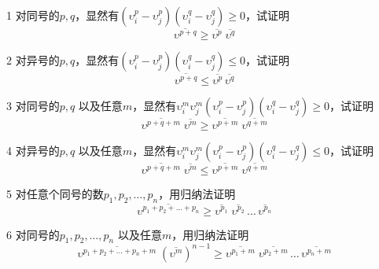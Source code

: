 \documentclass[CJK]{beamer}
\begin{document}
\begin{frame}
\bch
{\scriptsize
\bitem
\item[1]{对同号的$p, q$，显然有$(\upsilon_i^p - \upsilon_j^p)(\upsilon_i^q - \upsilon_j^q) \ge 0$，试证明
$$\overline{\upsilon^{p+q}} \ge \overline{\upsilon^p}\; \overline{\upsilon^q} $$}
\item[2]{
对异号的$p, q$，显然有$(\upsilon_i^p - \upsilon_j^p)(\upsilon_i^q - \upsilon_j^q) \le 0$，试证明
$$\overline{\upsilon^{p+q}} \le \overline{\upsilon^p}\,\overline{\upsilon^q} $$}
\item[3]{对同号的$p, q$ 以及任意$m$，显然有$\upsilon_i^m\upsilon_j^m(\upsilon_i^p - \upsilon_j^p)(\upsilon_i^q - \upsilon_j^q) \ge 0$，试证明
$$\overline{\upsilon^{p+q+m}} \;\overline{\upsilon^{m}} \ge \overline{\upsilon^{p+m}}\; \overline{\upsilon^{q+m}} $$}
\item[4]{对异号的$p, q$ 以及任意$m$，显然有$\upsilon_i^m\upsilon_j^m(\upsilon_i^p - \upsilon_j^p)(\upsilon_i^q - \upsilon_j^q) \le 0$，试证明
$$\overline{\upsilon^{p+q+m}} \;\overline{\upsilon^{m}} \le \overline{\upsilon^{p+m}}\; \overline{\upsilon^{q+m}} $$}
\item[5]{对任意个同号的数$p_1, p_2, \ldots, p_n$，用归纳法证明
$$\overline{\upsilon^{p_1+p_2+\ldots+p_n}} \ge \overline{\upsilon^{p_1}}\; \overline{\upsilon^{p_2}}\, \ldots\,\overline{\upsilon^{p_n}} $$
}
\item[6]{对同号的$p_1,p_2,\ldots, p_n$ 以及任意$m$，用归纳法证明
$$\overline{\upsilon^{p_1+p_2+\ldots+p_n+m}}\; \left(\overline{\upsilon^m}\right)^{n-1}  \ge \overline{\upsilon^{p_1+m}}\; \overline{\upsilon^{p_2+m}}\, \ldots\,\overline{\upsilon^{p_n+m}} $$
}
\eitem
}
\ech
\end{frame}
\end{document}
